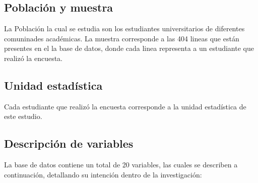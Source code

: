 \documentclass[12pt]{article}
\begin{document}
\subsection{Población y muestra}
La Población la cual se estudia son los estudiantes universitarios de diferentes comuninades académicas.
La muestra corresponde a las 404 lineas que están presentes en el la base de datos, donde cada linea representa a un estudiante que realizó la encuesta. 
\subsection{Unidad estadística}
Cada estudiante que realizó la encuesta corresponde a la unidad estadística de este estudio.
\subsection{Descripción de variables}
La base de datos contiene un total de 20 variables, las cuales se describen a continuación, detallando su intención dentro de la investigación:
\end{document}
